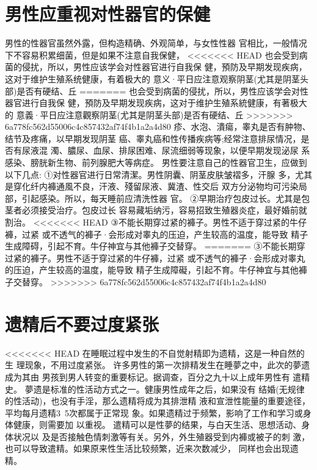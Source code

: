 \documentclass[12pt,UTF8]{ctexbook}
\begin{document}
\section{男性应重视对性器官的保健}

男性的性器官虽然外露，但构造精确、外观简单，与女性性器
官相比，一般情况下不容易积累细菌，但是如果不注意自我保健，
<<<<<<< HEAD
也会受到病菌的侵扰，所以，男性应该学会对性器官进行自我保
健，預防及早期发现疾病，这对于维护生殖系统健康，有着极大的
意义·平日应注意观察阴茎(尤其是阴茎头部)是否有硬结、丘
=======
也会受到病菌的侵扰，所以，男性应该学会对性器官进行自我保
健，預防及早期发现疾病，这对于维护生殖系統健康，有著极大的
意義·平日应注意觀察阴茎(尤其是阴茎头部)是否有硬结、丘
>>>>>>> 6a778fc562d55006c4c857432af74f4b1a2a4d80
疹、水泡、潰瘍，睾丸是否有肿物、结节及疼痛，以早期发现阴茎
癌、睾丸癌和性传播疾病等;经常注意排尿情况，是否有尿液混
濁、膿尿、血尿、排尿困难、尿流细弱等现象，以便早期发现泌尿
系感染、膀胱新生物、前列腺肥大等病症。
男性要注意自己的性器官卫生，应做到以下几点:
①对性器官进行日常清潔。男性阴囊、阴茎皮肤皱褶多，汗腺
多，尤其是穿化纤内褲通風不良，汗液、殘留尿液、冀渣、性交后
双方分泌物均可污染局部，引起感染。所以，每天睡前应清洗性器
官。
②早期治疗包皮过长。尤其是包茎者必须接受治疗。包皮过长
容易藏垢纳污，容易招致生殖器炎症，最好婚前就割治。
<<<<<<< HEAD
③不能长期穿过紧的褲子。男性不适于穿过紧的牛仔褲，过紧
或不透气的褲子·会形成对睾丸的压迫，产生较高的温度，能导致
精子生成障碍，引起不育。牛仔神宜与其他褲子交替穿。
=======
③不能长期穿过紧的褲子。男性不适于穿过紧的牛仔褲，过紧
或不透气的褲子·会形成对睾丸的压迫，产生较高的温度，能导致
精子生成障礙，引起不育。牛仔神宜与其他褲子交替穿。
>>>>>>> 6a778fc562d55006c4c857432af74f4b1a2a4d80

\section{遗精后不要过度紧张}

<<<<<<< HEAD
在睡眠过程中发生的不自觉射精即为遗精，这是一种自然的生
理现象，不用过度紧张。
许多男性的第一次排精发生在睡夢之中，此次的夢遗成为其由
男孩到男人转变的重要标记。据调查，百分之九十以上成年男性有
遣精史。
夢遗是标准的性活动方式之一。健康男性成年之后，如果没有
结婚(无规律的性活动)，也没有手淫，那么遗精将成为其排泄精
液和宣泄性能量的重要途径，平均每月遗精3~5次都属于正常现
象。如果遗精过于频繁，影响了工作和学习或身体健康，则需要加
以重视。
遣精可以是性夢的结果，与白天生活、思想活动、身体状况以
及是否接触色情刺激等有关。另外，外生殖器受到内褲或被子的刺
激，也可以导致遣精。如果原来性生活比较频繁，近来次数减少，
同样也会出现遗精。
\end{document}
